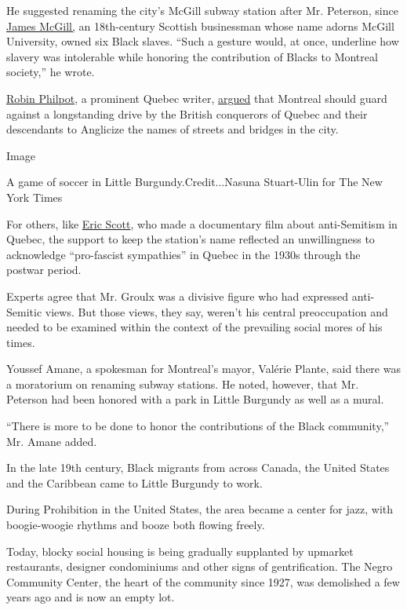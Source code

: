 He suggested renaming the city's McGill subway station after Mr.
Peterson, since
\href{https://www.mcgill.ca/about/history/meet-james-mcgill}{James
McGill,} an 18th-century Scottish businessman whose name adorns McGill
University, owned six Black slaves. ``Such a gesture would, at once,
underline how slavery was intolerable while honoring the contribution of
Blacks to Montreal society,'' he wrote.

\href{https://twitter.com/rphilpotinfo?lang=en}{Robin Philpot}, a
prominent Quebec writer,
\href{https://www.ledevoir.com/opinion/idees/581602/le-combat-pour-la-francisation-de-montreal-de-groulx-a-landry}{argued}
that Montreal should guard against a longstanding drive by the British
conquerors of Quebec and their descendants to Anglicize the names of
streets and bridges in the city.

Image

A game of soccer in Little Burgundy.Credit...Nasuna Stuart-Ulin for The
New York Times

For others, like \href{https://www.youtube.com/watch?v=jc0tDCt5JbY}{Eric
Scott}, who made a documentary film about anti-Semitism in Quebec, the
support to keep the station's name reflected an unwillingness to
acknowledge ``pro-fascist sympathies'' in Quebec in the 1930s through
the postwar period.

Experts agree that Mr. Groulx was a divisive figure who had expressed
anti-Semitic views. But those views, they say, weren't his central
preoccupation and needed to be examined within the context of the
prevailing social mores of his times.

Youssef Amane, a spokesman for Montreal's mayor, Valérie Plante, said
there was a moratorium on renaming subway stations. He noted, however,
that Mr. Peterson had been honored with a park in Little Burgundy as
well as a mural.

``There is more to be done to honor the contributions of the Black
community,'' Mr. Amane added.

In the late 19th century, Black migrants from across Canada, the United
States and the Caribbean came to Little Burgundy to work.

During Prohibition in the United States, the area became a center for
jazz, with boogie-woogie rhythms and booze both flowing freely.

Today, blocky social housing is being gradually supplanted by upmarket
restaurants, designer condominiums and other signs of gentrification.
The Negro Community Center, the heart of the community since 1927, was
demolished a few years ago and is now an empty lot.

